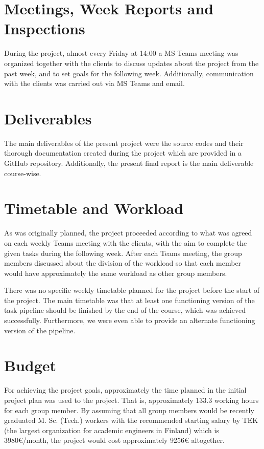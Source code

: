\section{Meetings, Week Reports and Inspections}

During the project, almost every Friday at 14:00 a MS Teams meeting was organized together with the clients to discuss updates about the project from the past week, and to set goals for the following week. Additionally, communication with the clients was carried out via MS Teams and email.

\section{Deliverables}

The main deliverables of the present project were the source codes and their thorough documentation created during the project which are provided in a GitHub repository. Additionally, the present final report is the main deliverable course-wise.

\section{Timetable and Workload}

As was originally planned, the project proceeded according to what was agreed on each weekly Teams meeting with the clients, with the aim to complete the given tasks during the following week. After each Teams meeting, the group members discussed about the division of the workload so that each member would have approximately the same workload as other group members.

There was no specific weekly timetable planned for the project before the start of the project. The main timetable was that at least one functioning version of the task pipeline should be finished by the end of the course, which was achieved successfully. Furthermore, we were even able to provide an alternate functioning version of the pipeline.

\section{Budget}

For achieving the project goals, approximately the time planned in the initial project plan was used to the project. That is, approximately 133.3 working hours for each group member. By assuming that all group members would be recently graduated M. Sc. (Tech.) workers with the recommended starting salary by TEK (the largest organization for academic engineers in Finland) which is 3980{\euro}/month, the project would cost approximately 9256{\euro} altogether.

